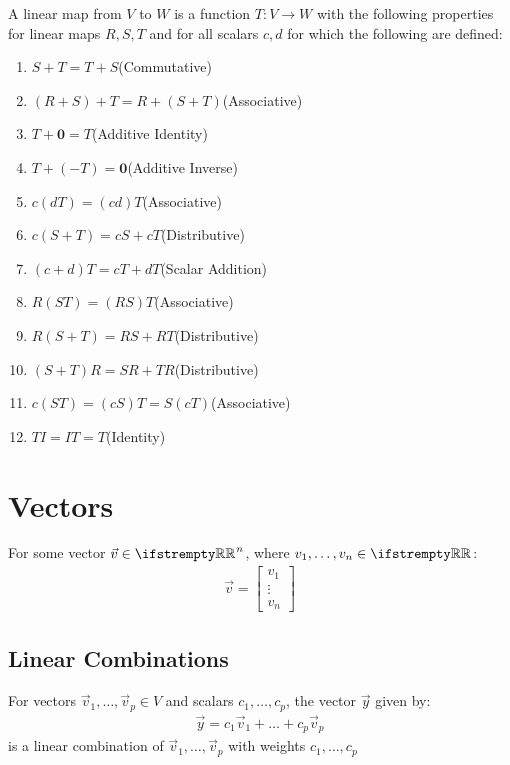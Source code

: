 \documentclass[12pt, a4paper]{article}
\begin{document}
\begin{multicols*}{3}
A linear map from $V$ to $W$ is a function $T: V \rightarrow W$ with the following properties for linear maps $R, S, T$ and for all scalars $c, d$ for which the following are defined:
\begin{enumerate}[\roman*.]
  \item $S + T = T + S$\hfill(Commutative)
  \item $(R + S) + T = R + (S + T)$\hfill(Associative)
  \item $T + \mathbf{0} = T$\hfill(Additive Identity)
  \item $T + (-T) = \mathbf{0}$\hfill(Additive Inverse)
  \item $c(dT) = (cd)T$\hfill(Associative)
  \item $c(S + T) = cS + cT$\hfill(Distributive)
  \item $(c+d)T = cT + dT$\hfill(Scalar Addition)
  \item $R(ST) = (RS)T$\hfill(Associative)
  \item $R(S + T) = RS + RT$\hfill(Distributive)
  \item $(S+T)R = SR + TR$\hfill(Distributive)
  \item $c(ST) = (cS)T = S(cT)$\hfill(Associative)
  \item $TI = IT = T$\hfill(Identity)
\end{enumerate}

\colbreak

\section{Vectors}
For some vector $\vec{v} \in \RR^n$, where $v_1, \ldots, v_n \in \RR$:
\begin{align*}
  \vec{v} = \begin{bmatrix}
    v_1 \\
    \vdots \\
    v_n
  \end{bmatrix}
\end{align*}

\subsection{Linear Combinations}
For vectors $\vec{v}_1,\ldots,\vec{v}_p \in V$ and scalars $c_1,\ldots,c_p$, the vector $\vec{y}$ given by:
\begin{align*}
  \vec{y} = c_1\vec{v}_1 + \ldots + c_p\vec{v}_p
\end{align*}
is a linear combination of $\vec{v}_1,\ldots,\vec{v}_p$ with weights $c_1,\ldots,c_p$


\end{multicols*}
\end{document}
